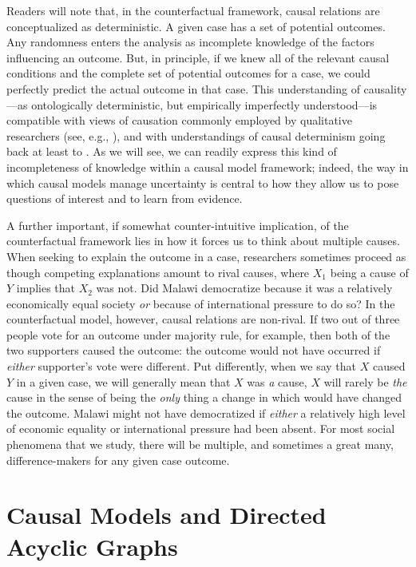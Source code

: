 \documentclass[12pt,]{book}
\begin{document}
Readers will note that, in the counterfactual framework, causal relations are conceptualized as deterministic. A given case has a set of potential outcomes. Any randomness enters the analysis as incomplete knowledge of the factors influencing an outcome. But, in principle, if we knew all of the relevant causal conditions and the complete set of potential outcomes for a case, we could perfectly predict the actual outcome in that case. This understanding of causality---as ontologically deterministic, but empirically imperfectly understood---is compatible with views of causation commonly employed by qualitative researchers (see, e.g., \citet{mahoney2008toward}), and with understandings of causal determinism going back at least to \citet{laplace1901philosophical}. As we will see, we can readily express this kind of incompleteness of knowledge within a causal model framework; indeed, the way in which causal models manage uncertainty is central to how they allow us to pose questions of interest and to learn from evidence.

A further important, if somewhat counter-intuitive implication, of the counterfactual framework lies in how it forces us to think about multiple causes. When seeking to explain the outcome in a case, researchers sometimes proceed as though competing explanations amount to rival causes, where \(X_1\) being a cause of \(Y\) implies that \(X_2\) was not. Did Malawi democratize because it was a relatively economically equal society \emph{or} because of international pressure to do so? In the counterfactual model, however, causal relations are non-rival. If two out of three people vote for an outcome under majority rule, for example, then both of the two supporters caused the outcome: the outcome would not have occurred if \emph{either} supporter's vote were different. Put differently, when we say that \(X\) caused \(Y\) in a given case, we will generally mean that \(X\) was \emph{a} cause, \(X\) will rarely be \emph{the} cause in the sense of being the \emph{only} thing a change in which would have changed the outcome. Malawi might not have democratized if \emph{either} a relatively high level of economic equality or international pressure had been absent. For most social phenomena that we study, there will be multiple, and sometimes a great many, difference-makers for any given case outcome.

\hypertarget{causal-models-and-directed-acyclic-graphs}{%
\section{Causal Models and Directed Acyclic Graphs}\label{causal-models-and-directed-acyclic-graphs}}
\end{document}

